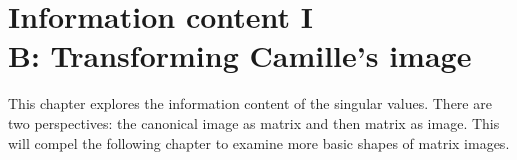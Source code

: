 \chapter[Information content I\\B: Transforming Camille's image]{Information content I\\B: Transforming Camille's image}

This chapter explores the information content of the singular values. There are two perspectives: the canonical image as matrix and then matrix as image. This will compel the following chapter to examine more basic shapes of matrix images.

%

\clearpage

\clearpage

\clearpage


\endinput
